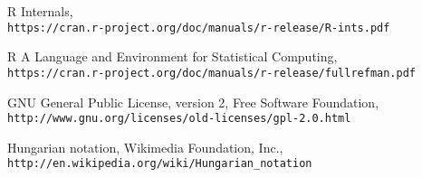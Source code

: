 \documentclass[runningheads,14pt,a4paper,openany]{book}
\begin{document}
\begin{thebibliography}{99}
 R Internals, \\\texttt{https://cran.r-project.org/doc/manuals/r-release/R-ints.pdf}

 R A Language and Environment for Statistical Computing, \\\texttt{https://cran.r-project.org/doc/manuals/r-release/fullrefman.pdf}

 GNU General Public License, version 2, Free Software Foundation, \\\texttt{http://www.gnu.org/licenses/old-licenses/gpl-2.0.html}

 Hungarian notation, Wikimedia Foundation, Inc., \\\texttt{http://en.wikipedia.org/wiki/Hungarian\_notation}

\end{thebibliography}

\newpage
\printindex


\end{document}
